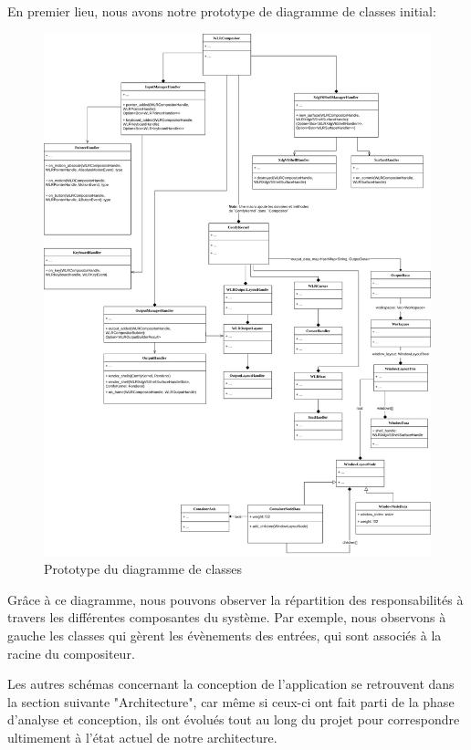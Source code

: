 \documentclass[titlepage]{article}
\begin{document}
\par
En premier lieu, nous avons notre prototype de diagramme de classes initial:
\bigskip

\begin{figure}[H]
	\centering
	\includegraphics[width=\textwidth]{Diagramme_de_classes.jpg}
	\caption{Prototype du diagramme de classes}
\end{figure}

\par
Grâce à ce diagramme, nous pouvons observer la répartition des responsabilités à travers les différentes composantes du système. Par exemple, nous observons à gauche les classes qui gèrent les évènements des entrées, qui sont associés à la racine du compositeur.
\bigskip

\par
Les autres schémas concernant la conception de l'application se retrouvent dans la section suivante "Architecture", car même si ceux-ci ont fait parti de la phase d'analyse et conception, ils ont évolués tout au long du projet pour correspondre ultimement à l'état actuel de notre architecture.
\bigskip
\end{document}
